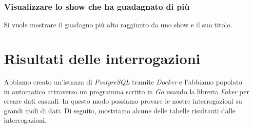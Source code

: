 \documentclass[a4paper,11pt]{article}
\begin{document}
\subsubsection{Visualizzare lo show che ha guadagnato di più}
Si vuole mostrare il guadagno più alto raggiunto da uno show e il suo titolo.


\section{Risultati delle interrogazioni}
Abbiamo creato un'istanza di \emph{PostgreSQL} tramite \emph{Docker} e l'abbiamo popolato in automatico attraverso un programma scritto in \emph{Go} usando la libreria \emph{Faker} per creare dati casuali.
In questo modo possiamo provare le nostre interrogazioni su grandi moli di dati.
Di seguito, mostriamo alcune delle tabelle risultanti dalle interrogazioni.
\end{document}
